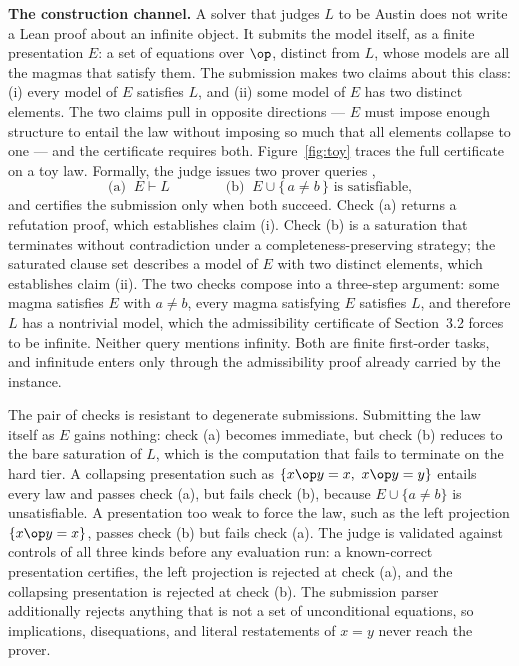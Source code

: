 \textbf{The construction channel.} A solver that judges $L$ to be Austin
does not write a Lean proof about an infinite object. It submits the model
itself, as a finite presentation $E$: a set of equations over $\op$, distinct
from $L$, whose models are all the magmas that satisfy them. The submission
makes two claims about this class: (i) every model of $E$ satisfies $L$, and
(ii) some model of $E$ has two distinct elements. The two claims pull in
opposite directions — $E$ must impose enough structure to entail the law
without imposing so much that all elements collapse to one — and the
certificate requires both. Figure~\ref{fig:toy} traces the full certificate
on a toy law. Formally, the judge issues two prover queries
\citep{kovacs2013first},
\begin{equation}
\label{eq:construction}
\text{(a)}\;\; E \vdash L
\qquad\qquad
\text{(b)}\;\; E \cup \{\,a \neq b\,\} \text{ is satisfiable,}
\end{equation}
and certifies the submission only when both succeed. Check (a) returns a
refutation proof, which establishes claim (i). Check (b) is a saturation
that terminates without contradiction under a completeness-preserving
strategy; the saturated clause set describes a model of $E$ with two
distinct elements, which establishes claim (ii). The two checks compose
into a three-step argument: some magma satisfies $E$ with $a \neq b$, every
magma satisfying $E$ satisfies $L$, and therefore $L$ has a nontrivial
model, which the admissibility certificate of Section~3.2 forces to be
infinite. Neither query mentions infinity. Both are finite first-order
tasks, and infinitude enters only through the admissibility proof already
carried by the instance.

The pair of checks is resistant to degenerate submissions. Submitting the
law itself as $E$ gains nothing: check (a) becomes immediate, but check (b)
reduces to the bare saturation of $L$, which is the computation that fails
to terminate on the hard tier. A collapsing presentation such as
$\{x \op y = x,\ x \op y = y\}$ entails every law and passes check (a), but
fails check (b), because $E \cup \{a \neq b\}$ is unsatisfiable. A
presentation too weak to force the law, such as the left projection
$\{x \op y = x\}$, passes check (b) but fails check (a). The judge is
validated against controls of all three kinds before any evaluation run: a
known-correct presentation certifies, the left projection is rejected at
check (a), and the collapsing presentation is rejected at check (b). The
submission parser additionally rejects anything that is not a set of
unconditional equations, so implications, disequations, and literal
restatements of $x = y$ never reach the prover.

